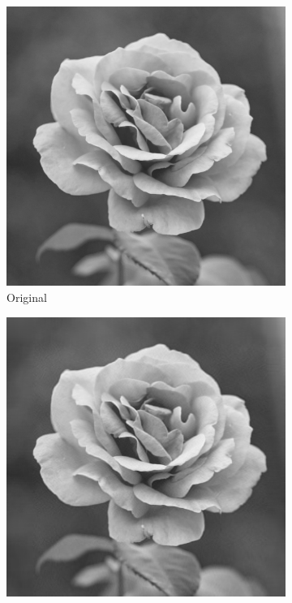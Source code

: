 \documentclass[a4paper,12pt]{report}
\begin{document}
\begin{figure}[H]
  \centering
    
  \begin{subfigure}{0.18\textwidth}
    \includegraphics[width=\linewidth]{images/original.png}
    \caption*{Original}
  \end{subfigure}\hfill
  \begin{subfigure}{0.18\textwidth}
    \includegraphics[width=\linewidth]{images/pca_100.png}

\end{subfigure}
\end{figure}
\end{document}
